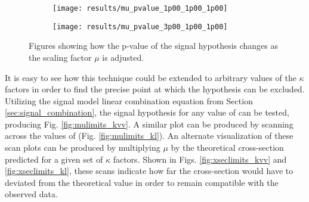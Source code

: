     \begin{figure}
        \centering
        \begin{subfigure}{0.48\textwidth} 
            \texttt{[image: results/mu\_pvalue\_1p00\_1p00\_1p00]}
            \caption{}%
            \label{fig:muscan_kvv1}
        \end{subfigure}
        \begin{subfigure}{0.48\textwidth}
            \texttt{[image: results/mu\_pvalue\_3p00\_1p00\_1p00]}
            \caption{}%
            \label{fig:muscan_kvv3}
        \end{subfigure}
        \caption{
            Figures showing how the p-value of the signal hypothesis changes
                as the scaling factor $\mu$ is adjusted.
        }
    \end{figure}


    It is easy to see how this technique could be extended to arbitrary values of the $\kappa$ factors
        in order to find the precise point at which the hypothesis can be excluded.
    Utilizing the signal model linear combination equation from Section \ref{sec:signal_combination},
        the signal hypothesis for any value of \kvv can be tested, producing Fig. \ref{fig:mulimits_kvv}.
    A similar plot can be produced by scanning across the values of \kl (Fig. \ref{fig:mulimits_kl}).
    An alternate visualization of these scan plots can be produced by multiplying $\mu$ by
        the theoretical cross-section predicted for a given set of $\kappa$ factors.
    Shown in Figs. \ref{fig:xseclimits_kvv} and \ref{fig:xseclimits_kl}, these scans indicate how far the \vbfproc cross-section would have to deviated from
        the theoretical value in order to remain compatible with the observed data.

